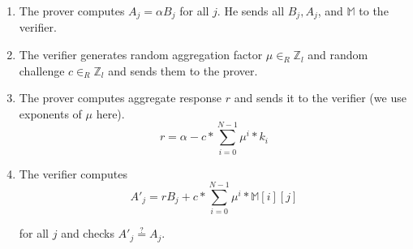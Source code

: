 \begin{appendices}
\begin{enumerate}
    \item The prover computes $A_j = \alpha B_j$ for all $j$. He sends all $B_j, A_j$, and $\mathbb{M}$ to the verifier.

    \item The verifier generates random aggregation factor $\mu \in_R \mathbb{Z}_l$ and random challenge $c \in_R \mathbb{Z}_l$ and sends them to the prover.

    \item The prover computes aggregate response $r$ and sends it to the verifier (we use exponents of $\mu$ here).\vspace{.115cm}
    \[ r = \alpha - c * \sum^{N-1}_{i=0} \mu^i * k_i \]

    \item The verifier computes
    \[ A'_j = r B_j + c * \sum^{N-1}_{i=0} \mu^i * \mathbb{M}[i][j] \]

    for all $j$ and checks $A'_j \stackrel{?}{=} A_j$.
\end{enumerate}

\end{appendices}

